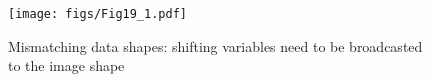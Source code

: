 \begin{figure}
    \centering
    \texttt{[image: figs/Fig19\_1.pdf]}
    \vspace{-7pt}
    \caption{Mismatching data shapes: shifting variables need to be broadcasted to the image shape
    }
    \label{fig:discussion3}
    \vspace{-10pt}
\end{figure}